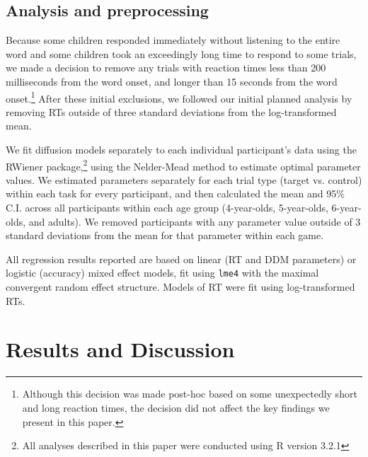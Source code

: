 \documentclass[10pt,letterpaper]{article}
\begin{document}
\subsection{Analysis and preprocessing}

Because some children responded immediately without listening to the entire word and some children took an exceedingly long time to respond to some trials, we made a decision to remove any trials with reaction times less than 200 milliseconds from the word onset, and longer than 15 seconds from the word onset.\footnote{Although this decision was made post-hoc based on some unexpectedly short and long reaction times, the decision did not affect the key findings we present in this paper.} After these initial exclusions, we followed our initial planned analysis by removing RTs outside of three standard deviations from the log-transformed mean.

We fit diffusion models separately to each individual participant's data using the RWiener package,\footnote{All analyses described in this paper were conducted using R version 3.2.1} using the Nelder-Mead method to estimate optimal parameter values. We estimated parameters separately for each trial type (target vs. control) within each task for every participant, and then calculated the mean and 95\% C.I. across all participants within each age group (4-year-olds, 5-year-olds, 6-year-olds, and adults). We removed participants with any parameter value outside of 3 standard deviations from the mean for that parameter within each game.  

All regression results reported are based on linear (RT and DDM parameters) or logistic (accuracy) mixed effect models, fit using \texttt{lme4} with the maximal convergent random effect structure. Models of RT were fit using log-transformed RTs.


\section{Results and Discussion}
\end{document}
